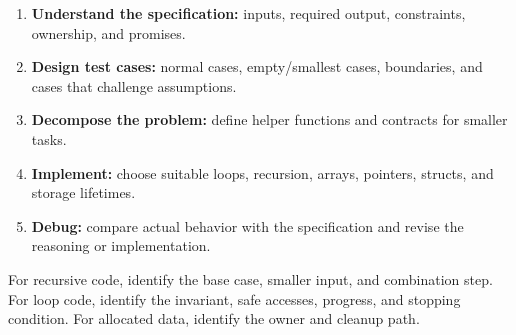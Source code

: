 \documentclass[11pt,a4paper]{article}
\providecommand{\tightlist}{\setlength{\itemsep}{0pt}\setlength{\parskip}{0pt}}
\begin{document}
\label{the-courses-problem-solving-workflow}
\hypertarget{the-courses-problem-solving-workflow}{}

\begin{enumerate}
\def\labelenumi{\arabic{enumi}.}
\tightlist
\item
  \textbf{Understand the specification:} inputs, required output, constraints, ownership, and promises.
\item
  \textbf{Design test cases:} normal cases, empty/smallest cases, boundaries, and cases that challenge assumptions.
\item
  \textbf{Decompose the problem:} define helper functions and contracts for smaller tasks.
\item
  \textbf{Implement:} choose suitable loops, recursion, arrays, pointers, structs, and storage lifetimes.
\item
  \textbf{Debug:} compare actual behavior with the specification and revise the reasoning or implementation.
\end{enumerate}

For recursive code, identify the base case, smaller input, and combination step. For loop code, identify the invariant, safe accesses, progress, and stopping condition. For allocated data, identify the owner and cleanup path.
\end{document}
